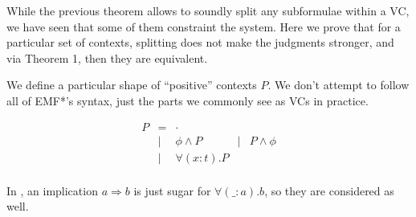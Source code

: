 While the previous theorem allows to soundly split any
subformulae within a VC, we have seen that some of them
constraint the system.
%
Here we prove that for a particular set of contexts, splitting
does not make the judgments stronger, and via Theorem 1, then they are
equivalent.

We define a particular shape of ``positive'' contexts $P$.
We don't attempt to follow all of EMF*'s syntax, just the parts
we commonly see as VCs in practice.

\[
\begin{array}{rclcl}
    P &=&    \cdot  & & \\
       & \mid & \phi \land P            &\mid& P \land \phi \\
       & \mid & \forall (x:t). P \\
\end{array}
\]

In \emf, an implication $a \Rightarrow b$ is just sugar for
$\forall (\_:a). b$, so they are considered as well.


